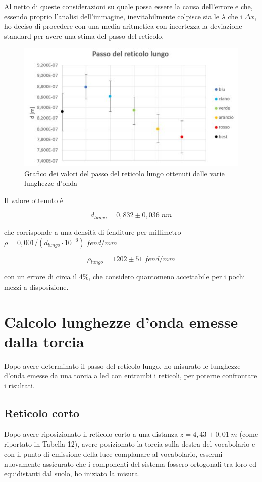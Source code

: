 \documentclass{article}
\begin{document}
\vspace{3mm}

Al netto di queste considerazioni su quale possa essere la causa dell'errore e che, essendo proprio l'analisi dell'immagine, inevitabilmente colpisce sia le $\lambda$ che i $\Delta x$, ho deciso di procedere con una media aritmetica con incertezza la deviazione standard per avere una stima del passo del reticolo.

\begin{figure}[h]
    \centering
    \includegraphics[width=0.6\linewidth]{graph_d.JPG}
    \caption{Grafico dei valori del passo del reticolo lungo ottenuti dalle varie lunghezze d'onda}
    \label{graph_d}
\end{figure}

\vspace{3mm}

Il valore ottenuto è 

\[d_{lungo} = 0,832 \pm 0,036 \; nm\]

che corrisponde a una densità di fenditure per millimetro $\rho = 0,001/(d_{lungo}\cdot 10^{-6}) \; fend/mm $

\[\rho_{lungo} = 1202 \pm 51 \; fend/mm\]

con un errore di circa il 4\%, che considero quantomeno accettabile per i pochi mezzi a disposizione.

\section{Calcolo lunghezze d'onda emesse dalla torcia}
Dopo avere determinato il passo del reticolo lungo, ho misurato le lunghezze d'onda emesse da una torcia a led con entrambi i reticoli, per poterne confrontare i risultati.

\subsection{Reticolo corto}
Dopo avere riposizionato il reticolo corto a una distanza $z = 4,43 \pm 0,01 \; m$ (come riportato in Tabella 12), avere posizionato la torcia sulla destra del vocabolario e con il punto di emissione della luce complanare al vocabolario, essermi nuovamente assicurato che i componenti del sistema fossero ortogonali tra loro ed equidistanti dal suolo, ho iniziato la misura.
\end{document}
